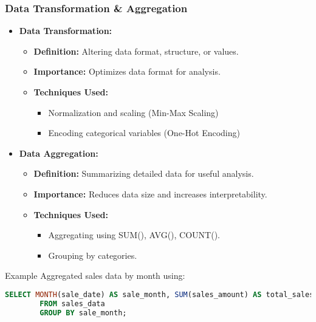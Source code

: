 \documentclass[aspectratio=169]{beamer}
\begin{document}
\begin{frame}[fragile]
    \frametitle{Data Transformation \& Aggregation}
    \begin{itemize}
        \item \textbf{Data Transformation:}
        \begin{itemize}
            \item \textbf{Definition:} Altering data format, structure, or values.
            \item \textbf{Importance:} Optimizes data format for analysis.
            \item \textbf{Techniques Used:}
            \begin{itemize}
                \item Normalization and scaling (Min-Max Scaling)
                \item Encoding categorical variables (One-Hot Encoding)
            \end{itemize}
        \end{itemize}
        
        \item \textbf{Data Aggregation:}
        \begin{itemize}
            \item \textbf{Definition:} Summarizing detailed data for useful analysis.
            \item \textbf{Importance:} Reduces data size and increases interpretability.
            \item \textbf{Techniques Used:}
            \begin{itemize}
                \item Aggregating using SUM(), AVG(), COUNT().
                \item Grouping by categories.
            \end{itemize}
        \end{itemize}
    \end{itemize}
    
    \begin{block}{Example}
        Aggregated sales data by month using:
        \begin{lstlisting}[language=SQL]
        SELECT MONTH(sale_date) AS sale_month, SUM(sales_amount) AS total_sales
        FROM sales_data
        GROUP BY sale_month;
        \end{lstlisting}
    \end{block}
\end{frame}
\end{document}

